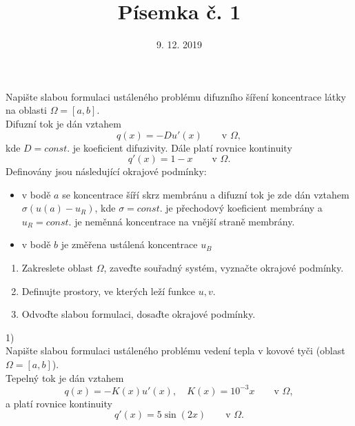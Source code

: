 \documentclass{article}
\begin{document}
\title{Písemka č. 1}
\date{9. 12. 2019}
\author{}
\maketitle

\noindent
Napište slabou formulaci ustáleného problému difuzního šíření koncentrace látky na oblasti $\Omega=[a,b]$.\\
Difuzní tok je dán vztahem
\[
    q(x) = -Du'(x) \qquad \textrm{v }\Omega,
\]
kde $D=const.$ je koeficient difuzivity. Dále platí rovnice kontinuity
\[
    q'(x) = 1-x \qquad \textrm{v }\Omega.
\]
Definovány jsou následující okrajové podmínky:
\begin{itemize}
\item v bodě $a$ se koncentrace šíří skrz membránu a difuzní tok je zde dán vztahem $\sigma(u(a) - u_R)$,
kde $\sigma=const.$ je přechodový koeficient membrány a $u_R=const.$ je neměnná koncentrace na vnější straně membrány.

\item v bodě $b$ je změřena ustálená koncentrace $u_B$
\end{itemize}


\vspace{2cm}

\begin{enumerate}
\item Zakreslete oblast $\Omega$, zaveďte souřadný systém, vyznačte okrajové podmínky.
\item Definujte prostory, ve kterých leží funkce $u,v$.
\item Odvoďte slabou formulaci, dosaďte okrajové podmínky.
\end{enumerate}




\newpage

\noindent


1)\\
Napište slabou formulaci ustáleného problému vedení tepla v kovové tyči (oblast $\Omega=[a,b]$).\\
Tepelný tok je dán vztahem
\[
    q(x) = -K(x)u'(x), \quad K(x)=10^{-3}x \qquad \textrm{v }\Omega,
\]
a platí rovnice kontinuity
\[
    q'(x) = 5\sin(2x) \qquad \textrm{v }\Omega.
\]
\end{document}
